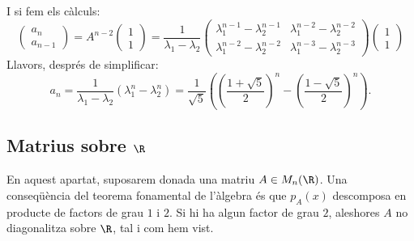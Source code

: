 I si fem els càlculs:
\[
\begin{pmatrix}
a_n\\a_{n-1}
\end{pmatrix}=
A^{n-2} \begin{pmatrix} 1 \\ 1 \end{pmatrix}=
\frac{1}{\lambda_1-\lambda_2} \begin{pmatrix}
\lambda_1^{n-1}-\lambda_2^{n-1} &
\lambda_1^{n-2}-\lambda_2^{n-2} \\
\lambda_1^{n-2}-\lambda_2^{n-2} &
\lambda_1^{n-3}-\lambda_2^{n-3} 
\end{pmatrix}\begin{pmatrix} 1 \\ 1 \end{pmatrix}
\]
Llavors, després de simplificar:
\[
a_n= \frac{1}{\lambda_1-\lambda_2}(\lambda_1^n-\lambda_2^n)=\frac{1}{\sqrt{5}}\left(
\left(\frac{1+\sqrt{5}}{2}\right)^n-\left(\frac{1-\sqrt{5}}{2}\right)^n
\right).
\]

\subsection{Matrius sobre \texorpdfstring{$\R$}{R}}
En aquest apartat, suposarem donada una matriu $A\in M_n(\R)$. Una conseqüència del teorema fonamental de l'àlgebra és que $p_A(x)$ descomposa en producte de factors de grau $1$ i $2$. Si hi ha algun factor de grau $2$, aleshores $A$ no diagonalitza sobre $\R$, tal i com hem vist.

